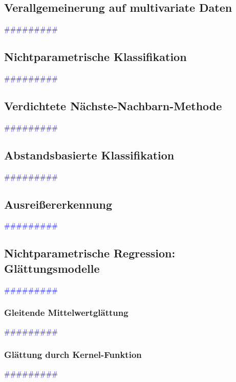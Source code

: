 \documentclass{article}
\begin{document}
  \subsection{Verallgemeinerung auf multivariate Daten} %
       \textcolor{blue}{\#\#\#\#\#\#\#\#\#}
  \subsection{Nichtparametrische Klassifikation} %
       \textcolor{blue}{\#\#\#\#\#\#\#\#\#}
  \subsection{Verdichtete Nächste-Nachbarn-Methode} %
       \textcolor{blue}{\#\#\#\#\#\#\#\#\#}
  \subsection{Abstandsbasierte Klassifikation} %
       \textcolor{blue}{\#\#\#\#\#\#\#\#\#}
  \subsection{Ausreißererkennung} %
       \textcolor{blue}{\#\#\#\#\#\#\#\#\#}
  \subsection{Nichtparametrische Regression: Glättungsmodelle} %
       \textcolor{blue}{\#\#\#\#\#\#\#\#\#}
      \subsubsection{Gleitende Mittelwertglättung} %
       \textcolor{blue}{\#\#\#\#\#\#\#\#\#}
    \subsubsection{Glättung durch Kernel-Funktion} %
       \textcolor{blue}{\#\#\#\#\#\#\#\#\#}
\end{document}

